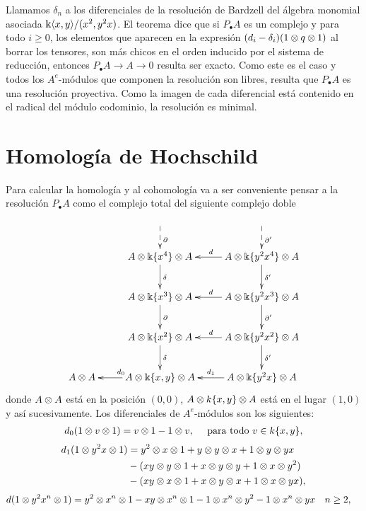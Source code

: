\documentclass[fleqn,../tesis.tex]{subfiles}
\begin{document}
Llamamos $\delta_n$ a los diferenciales de la resolución de Bardzell del álgebra monomial asociada $\Bbbk\langle x,y \rangle/(x^2, y^2x)$. El teorema \cite[4.1]{CS} dice que si $P_{\bullet}A$ es un complejo y para todo $i \geq 0$, los elementos
que aparecen en la expresión $(d_i - \delta_i) (1 \otimes q \otimes 1)$ al borrar los tensores, son más chicos en el orden
inducido por el sistema de reducción, entonces $P_{\bullet}A \to A \to 0$ resulta ser exacto. Como este es el caso
y todos los $A^e$-módulos que componen la resolución son libres, resulta que $P_{\bullet}A$ es una resolución
proyectiva. Como la imagen de cada diferencial está contenido en el radical del módulo codominio, la resolución es minimal.
\section{Homología de Hochschild}
Para calcular la homología y al cohomología va a ser conveniente pensar a la resolución $P_{\bullet}A$
como el complejo total del siguiente complejo doble
\begin{align*}
\xymatrix{
	& & \\
	& A \ox \field\{x^4\} \ox A \ar[d]^{\delta} \ar@{<--}[u]_{\partial} & A \ox \field\{y^2x^4\} \ox A \ar[l]_d \ar[d]^{\delta'} \ar@{<--}[u]_{\partial'} \\
	& A \ox \field\{x^3\} \ox A \ar[d]^{\partial} & A \ox \field\{y^2x^3\} \ox A \ar[l]_d \ar[d]^{\partial'} \\
	& A \ox \field\{x^2\} \ox A \ar[d]^{\delta} & A \ox \field\{y^2x^2\} \ox A \ar[l]_d \ar[d]^{\delta'} \\
	A \ox A & A \ox \field\{x, y\} \ox A \ar[l]_{d_0} & A \ox \field \{y^2x\} \ox A \ar[l]_{d_1} \\
}
\end{align*}
donde $A\otimes A$ está en la posición $(0,0)$, $A \otimes k\{x, y\} \otimes A$ está en el lugar $(1,0)$ y así sucesivamente.
Los diferenciales de $A^e$-módulos son los siguientes:
\begin{align*}
	d_0(1 \otimes v \otimes 1) = v \otimes 1 - 1 \otimes v, \quad\text{ para todo } v \in k\{x, y\},
\end{align*}
\begin{align*}
	d_1(1 \otimes y^2x \otimes 1) &= y^2 \otimes x \otimes 1 + y \otimes y \otimes x + 1 \otimes y \otimes yx \\
		&-(xy \otimes y \otimes 1 + x \otimes y \otimes y + 1 \otimes x \otimes y^2) \\
		&-(xy \otimes x \otimes 1 + x \otimes y \otimes x + 1 \otimes x \otimes yx),
\end{align*}
\begin{align*}
	d(1 \otimes y^2x^n \otimes 1) &= y^2 \otimes x^n \otimes 1 - xy \otimes x^n \otimes 1 - 1 \otimes x^n \otimes y^2 - 1 \otimes x^n \otimes yx \quad n\geq 2,
\end{align*}
\end{document}
